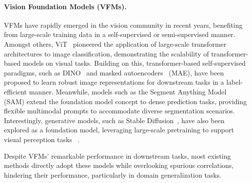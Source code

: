 \paragraph{Vision Foundation Models (VFMs).}
VFMs have rapidly emerged in the vision community in recent years, benefiting from large-scale training data in a self-supervised or semi-supervised manner. 
Amongst others, ViT~\cite{dosovitskiy2020image} pioneered the application of large-scale transformer architectures to image classification, demonstrating the scalability of transformer-based models on visual tasks. 
Building on this, transformer-based self-supervised paradigms, such as DINO~\cite{caron2021emerging,oquab2023dinov2,simeoni2025dinov3} and masked autoencoders~\cite{he2022masked} (MAE), have been proposed to learn robust image representations for downstream tasks in a label-efficient manner.
Meanwhile, models such as the Segment Anything Model~\cite{kirillov2023segany,ravi2024sam2} (SAM) extend the foundation model concept to dense prediction tasks, providing flexible multimodal prompts to accommodate diverse segmentation scenarios. 
Interestingly, generative models, such as Stable Diffusion~\cite{rombach2022high}, have also been explored as a foundation model, leveraging large-scale pretraining to support visual perception tasks ~\cite{he2025generalized,he2024diffusion,he2025boosting}.

Despite VFMs' remarkable performance in downstream tasks, most existing methods directly adopt these models while overlooking spurious correlations, hindering their performance, particularly in domain generalization tasks.
\vspace{-2mm}
